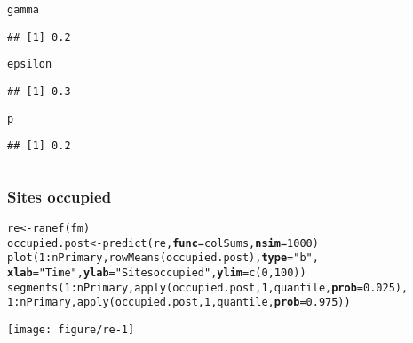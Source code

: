 \documentclass[color=usenames,dvipsnames]{beamer}\usepackage[]{graphicx}\usepackage[]{color}
\makeatletter
\newcommand{\hlnum}[1]{\textcolor[rgb]{0.69,0.494,0}{#1}}%
\newcommand{\hlstr}[1]{\textcolor[rgb]{0.749,0.012,0.012}{#1}}%
\newcommand{\hlopt}[1]{\textcolor[rgb]{0,0,0}{#1}}%
\newcommand{\hlstd}[1]{\textcolor[rgb]{0,0,0}{#1}}%
\newcommand{\hlkwb}[1]{\textcolor[rgb]{0,0.341,0.682}{#1}}%
\newcommand{\hlkwc}[1]{\textcolor[rgb]{0,0,0}{\textbf{#1}}}%
\newcommand{\hlkwd}[1]{\textcolor[rgb]{0.004,0.004,0.506}{#1}}%
\newenvironment{kframe}{%
 \def\at@end@of@kframe{}%
 \ifinner\ifhmode%
  \def\at@end@of@kframe{\end{minipage}}%
  \begin{minipage}{\columnwidth}%
 \fi\fi%
 \def\FrameCommand##1{\hskip\@totalleftmargin \hskip-\fboxsep
 \colorbox{shadecolor}{##1}\hskip-\fboxsep
     \hskip-\linewidth \hskip-\@totalleftmargin \hskip\columnwidth}%
 \MakeFramed {\advance\hsize-\width
   \@totalleftmargin\z@ \linewidth\hsize
   \@setminipage}}%
 {\par\unskip\endMakeFramed%
 \at@end@of@kframe}
\newenvironment{knitrout}{}{} %
\makeatother
\begin{document}
\begin{frame}[fragile]
\begin{columns}
\begin{column}{0.5\textwidth}
\begin{knitrout}
\begin{kframe}
\begin{alltt}
\hlstd{gamma}
\end{alltt}
\begin{verbatim}
## [1] 0.2
\end{verbatim}
\begin{alltt}
\hlstd{epsilon}
\end{alltt}
\begin{verbatim}
## [1] 0.3
\end{verbatim}
\begin{alltt}
\hlstd{p}
\end{alltt}
\begin{verbatim}
## [1] 0.2
\end{verbatim}
\end{kframe}
\end{knitrout}
    \end{column}
    \end{columns}
\end{frame}




\begin{frame}[fragile]
  \frametitle{Sites occupied}
\begin{knitrout}\scriptsize
{}\color{fgcolor}\begin{kframe}
\begin{alltt}
\hlstd{re} \hlkwb{<-} \hlkwd{ranef}\hlstd{(fm)}
\hlstd{occupied.post} \hlkwb{<-} \hlkwd{predict}\hlstd{(re,} \hlkwc{func}\hlstd{=colSums,} \hlkwc{nsim}\hlstd{=}\hlnum{1000}\hlstd{)}
\hlkwd{plot}\hlstd{(}\hlnum{1}\hlopt{:}\hlstd{nPrimary,} \hlkwd{rowMeans}\hlstd{(occupied.post),} \hlkwc{type}\hlstd{=}\hlstr{"b"}\hlstd{,}
     \hlkwc{xlab}\hlstd{=}\hlstr{"Time"}\hlstd{,} \hlkwc{ylab}\hlstd{=}\hlstr{"Sites occupied"}\hlstd{,} \hlkwc{ylim}\hlstd{=}\hlkwd{c}\hlstd{(}\hlnum{0}\hlstd{,} \hlnum{100}\hlstd{))}
\hlkwd{segments}\hlstd{(}\hlnum{1}\hlopt{:}\hlstd{nPrimary,} \hlkwd{apply}\hlstd{(occupied.post,} \hlnum{1}\hlstd{, quantile,} \hlkwc{prob}\hlstd{=}\hlnum{0.025}\hlstd{),}
         \hlnum{1}\hlopt{:}\hlstd{nPrimary,} \hlkwd{apply}\hlstd{(occupied.post,} \hlnum{1}\hlstd{, quantile,} \hlkwc{prob}\hlstd{=}\hlnum{0.975}\hlstd{))}
\end{alltt}
\end{kframe}

{\centering \texttt{[image: figure/re-1]} 

}



\end{knitrout}
\end{frame}
\end{document}
